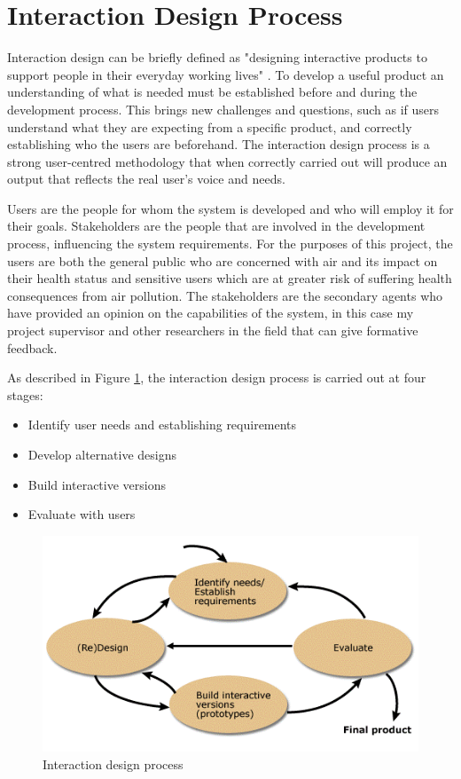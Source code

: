 \section{Interaction Design Process}
Interaction design can be briefly defined as "designing interactive products to support people in their everyday working lives" \cite{Sharp2011}. To develop a useful product an understanding of what is needed must be established before and during the development process. This brings new challenges and questions, such as if users understand what they are expecting from a specific product, and correctly establishing who the users are beforehand. The interaction design process is a strong user-centred methodology that when correctly carried out will produce an output that reflects the real user's voice and needs. 

Users are the people for whom the system is developed and who will employ it for their goals. Stakeholders are the people that are involved in the development process, influencing the system requirements. For the purposes of this project, the users are both the general public who are concerned with air and its impact on their health status and sensitive users which are at greater risk of suffering health consequences from air pollution. The stakeholders are the secondary agents who have provided an opinion on the capabilities of the system, in this case my project supervisor and other researchers in the field that can give formative feedback.

As described in Figure \ref{fig:interaction_design}, the interaction design process is carried out at four stages: \begin{itemize}
  \item Identify user needs and establishing requirements
  \item Develop alternative designs
  \item Build interactive versions
  \item Evaluate with users
\end{itemize}

\begin{figure}[h]
  \includegraphics[scale=.8]{images/interatcion-design.png}
  \caption[Interaction design process]{Interaction design process \cite{Sharp2011}}
  \label{fig:interaction_design}
\end{figure}

